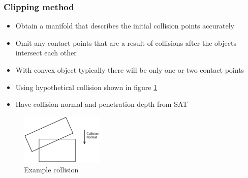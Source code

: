 \documentclass[a4paper]{article}
\begin{document}
\subsubsection{Clipping method}

\begin{itemize}
  \item
    Obtain a manifold that describes the initial collision points accurately

  \item
    Omit any contact points that are a result of collisions after the objects
    intersect each other

  \item
    With convex object typically there will be only one or two contact points

\end{itemize}


\begin{itemize}
  \item
    Using hypothetical collision shown in figure \ref{fig:manifolds_clipping_0}

  \item
    Have collision normal and penetration depth from SAT

\end{itemize}

\begin{figure}[h!]
  \centering
  \includegraphics[width=0.35\textwidth]{graphics/manifolds_clipping_0.eps}
  \caption{Example collision}
  \label{fig:manifolds_clipping_0}
\end{figure}
\FloatBarrier
\end{document}
